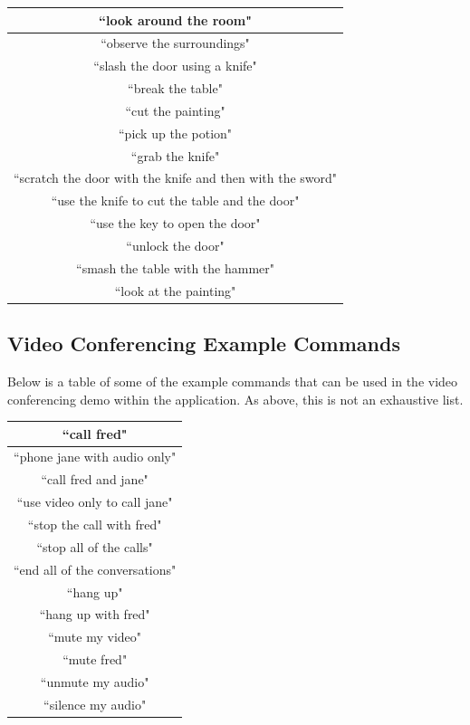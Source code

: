 \documentclass[11pt]{article}
\begin{document}
\begin{appendices}
\begin{table}[H]
\centering
\begin{tabular}{|c|}
\hline
``look around the room"                    \\ \hline
``observe the surroundings"   \\ \hline
``slash the door using a knife"           \\ \hline
``break the table"  \\ \hline
``cut the painting"      \\ \hline
``pick up the potion"        \\ \hline
``grab the knife" \\ \hline
``scratch the door with the knife and then with the sword"                      \\ \hline
``use the knife to cut the table and the door"            \\ \hline
``use the key to open the door"                \\ \hline
``unlock the door"                    \\ \hline
``smash the table with the hammer"              \\ \hline
``look at the painting"             \\ \hline
\end{tabular}
\end{table}

\newpage
\subsection{Video Conferencing Example Commands}
\label{appendix:call-examples}

Below is a table of some of the example commands that can be used in the video conferencing demo within the application. As above, this is not an exhaustive list.

\begin{table}[H]
\centering
\begin{tabular}{|c|}
\hline
``call fred"                    \\ \hline
``phone jane with audio only"   \\ \hline
``call fred and jane"           \\ \hline
``use video only to call jane"  \\ \hline
``stop the call with fred"      \\ \hline
``stop all of the calls"        \\ \hline
``end all of the conversations" \\ \hline
``hang up"                      \\ \hline
``hang up with fred"            \\ \hline
``mute my video"                \\ \hline
``mute fred"                    \\ \hline
``unmute my audio"              \\ \hline
``silence my audio"             \\ \hline
\end{tabular}
\end{table}


\end{appendices}
\end{document}
